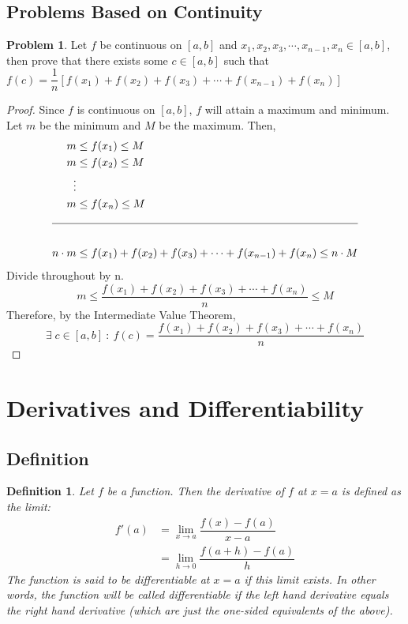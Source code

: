 \documentclass[14]{article}
\newtheorem{define}{Definition}
\theoremstyle{definition}
\newtheorem{prob}{Problem}
\begin{document}
\subsection{Problems Based on Continuity}
\begin{prob}
Let $f$ be continuous on $[a, b]$ and $x_1, x_2, x_3, \cdots, x_{n-1}, x_n \in [a, b]$, then prove that there exists some $c \in [a, b]$ such that $f(c) = \dfrac{1}{n} \left[f(x_1) + f(x_2) + f(x_3) + \cdots + f(x_{n-1}) + f(x_n)\right]$\\
\begin{proof}
Since $f$ is continuous on $[a, b]$, $f$ will attain a maximum and minimum. Let $m$ be the minimum and $M$ be the maximum.
Then,
\begin{align*}
m &\le f(x_1) \le M\\
m &\le f(x_2) \le M\\
\vdots\\
m &\le f(x_n) \le M\\
\cline{1-2}\\
n\cdot m &\le f(x_1) + f(x_2) + f(x_3) + \cdots + f(x_{n-1}) + f(x_n) \le n\cdot M
\end{align*}
Divide throughout by n.\\
\[
m \leq \dfrac{f(x_1) + f(x_2) + f(x_3) + \cdots + f(x_n)}{n} \leq M
\]
Therefore, by the Intermediate Value Theorem,\\
\[
\exists\; c \in [a, b] \: : \: f(c) = \dfrac{f(x_1) + f(x_2) + f(x_3) + \cdots + f(x_n)}{n}
\]
\end{proof}
\end{prob}
\pagebreak
\section{Derivatives and Differentiability}
\subsection{Definition}
\begin{define}
Let $f$ be a function. Then the derivative of $f$ at $x = a$ is defined as the limit:
\begin{align*}
f'(a) &= \lim\limits_{x \to a} \dfrac{f(x) - f(a)}{x-a}\\
&= \lim\limits_{h \to 0} \dfrac{f(a + h) - f(a)}{h}
\end{align*}
The function is said to be differentiable at $x=a$ if this limit exists. In other words, the function will be called differentiable if the left hand derivative equals the right hand derivative (which are just the one-sided equivalents of the above).
\end{define}
\end{document}
